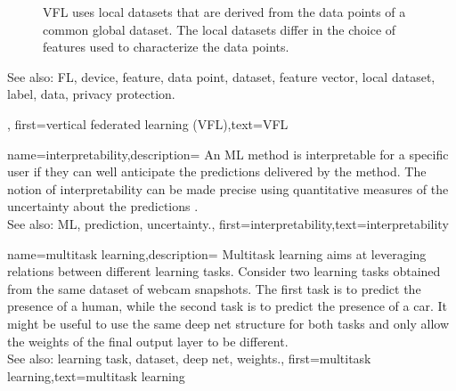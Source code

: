 {{\begin{figure}[H]
\begin{center}
			\end{center}
			\caption{VFL uses local datasets that are derived from the data points of a common global dataset. 
				The local datasets differ in the choice of features used to characterize the data points.\label{fig_vertical_FL}}
		\end{figure}
		See also: FL, device, feature, data point, dataset, feature vector, local dataset, label, data, privacy protection.},
	first={vertical federated learning (VFL)},text={VFL}
} 

{name={interpretability},description=
		{An ML method is interpretable for a specific user if 
			they can well anticipate the predictions delivered by the method. 
			The notion of interpretability can be made precise using quantitative 
			measures of the uncertainty about the predictions \cite{JunXML2020}.
						\\ 
		See also: ML, prediction, uncertainty.},
		first={interpretability},text={interpretability}
}

{name={multitask learning},description=
	{Multitask learning aims at leveraging relations between 
	 different learning tasks. Consider two learning tasks obtained from the 
	 same dataset of webcam snapshots. The first task is to predict the presence 
	 of a human, while the second task is to predict the presence of a car. It might be useful 
	 to use the same deep net structure for both tasks and only allow the weights of 
	 the final output layer to be different.
	 			\\ 
		See also: learning task, dataset, deep net, weights.},
	first={multitask learning},text={multitask learning}
}

